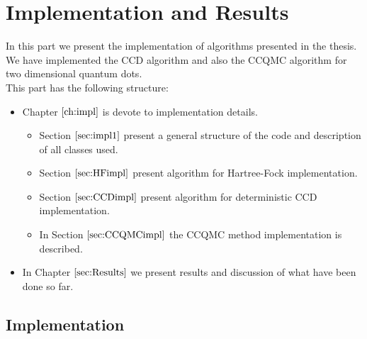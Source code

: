 \part{Implementation and Results}
In this part we present the implementation of algorithms presented in the thesis. We have implemented the CCD algorithm and also the CCQMC algorithm for two dimensional quantum dots. \\
This part has the following structure:\\
\begin{itemize}
\item Chapter $\ref{ch:impl}$ is devote to implementation details.
\begin{itemize}
\item Section $\ref{sec:impl1}$ present a general structure of the code and description of all classes used.
\item Section $\ref{sec:HFimpl}$ present algorithm for Hartree-Fock implementation.
\item Section $\ref{sec:CCDimpl}$ present algorithm for deterministic CCD implementation.
\item In Section $\ref{sec:CCQMCimpl}$ the CCQMC method implementation is described.
\end{itemize}
\item In Chapter $\ref{sec:Results}$ we present results and discussion of what have been done so far.

\end{itemize}
\chapter{Implementation}\label{ch:impl}
